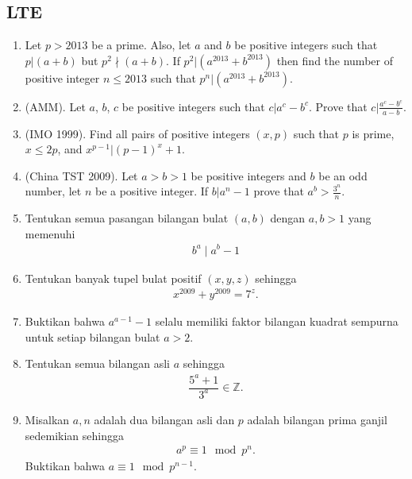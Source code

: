 \documentclass[11pt]{scrartcl}
\begin{document}
\subsection{LTE}
\begin{enumerate}[resume]
    \item Let $p > 2013$ be a prime. Also, let $a$ and $b$ be positive integers such that $p|(a + b)$ but $p^2 \nmid  (a + b)$. If $p^2|(a^{2013} + b^{2013})$ then find the number of positive integer $n \leq 2013$ such that $p^n|(a^{2013} + b^{2013})$.
    
    \item (AMM). Let $a$, $b$, $c$ be positive integers such that $c | a^c-b^c$. Prove that $c | \frac{a^c-b^c}{a-b}$.
    
    \item (IMO 1999). Find all pairs of positive integers $(x, p)$ such that $p$ is prime, $x \leq 2p$, and $x^{p-1} | (p - 1)^x + 1$.
    
    \item (China TST 2009). Let $a > b > 1$ be positive integers and $b$ be an odd number, let $n$ be a positive integer. If $b|a^n-1$ prove that $a^b > \frac{3^n}{n}$.
    
    \item Tentukan semua pasangan bilangan bulat $(a,b)$ dengan $a,b > 1$ yang memenuhi 
    \begin{align*}
        b^a \mid a^b -1
    \end{align*}
    
    \item Tentukan banyak tupel bulat positif $(x,y,z)$ sehingga
    \begin{align*}
        x^{2009}+y^{2009} = 7^z.
    \end{align*}
    
    \item Buktikan bahwa $a^{a-1}-1$ selalu memiliki faktor bilangan kuadrat sempurna untuk setiap bilangan bulat $a > 2$.
    
    \item Tentukan semua bilangan asli $a$ sehingga
    \begin{align*}
        \dfrac{5^a+1}{3^a} \in \mathbb{Z}.
    \end{align*}
    
    \item Misalkan $a,n$ adalah dua bilangan asli dan $p$ adalah bilangan prima ganjil sedemikian sehingga
    \begin{align*}
        a^p \equiv 1 \mod p^n.
    \end{align*}
    Buktikan bahwa $a \equiv 1 \mod p^{n-1}.$


\end{enumerate}
\end{document}
